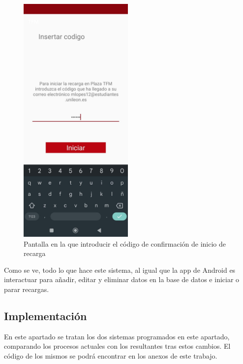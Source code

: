 \documentclass[12pt,a4paper,onecolumn,oneside]{report}
\begin{document}
\begin{figure}[H] 
\centering
  \includegraphics[width=0.5\textwidth]{figuras/design8.png}
  \caption[Pantalla en la que introducir el código de confirmación de inicio de recarga]{Pantalla en la que introducir el código de confirmación de inicio de recarga\\
  }
  \label{fig:design8}
\end{figure}

Como se ve, todo lo que hace este sistema, al igual que la app de Android es interactuar para añadir, editar y eliminar datos en la base de datos e iniciar o parar recargas.


\subsection{Implementación}

En este apartado se tratan los dos sistemas programados en este apartado, comparando los procesos actuales con los resultantes tras estos cambios. El código de los mismos se podrá encontrar en los anexos de este trabajo.
\end{document}
